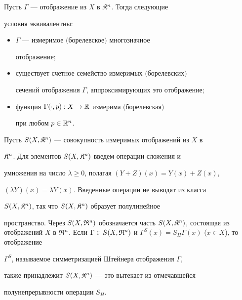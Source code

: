 \begin{prop} 


Пусть $\Gamma$ --- отображение из $X$ в $\frak K^n$. Тогда следующие 


условия эквивалентны${:}$ 


\begin{itemize} 


\item[1)] $\Gamma$ --- измеримое $($борелевское$)$ многозначное


отображение$;$ 


\item[2)] существует счетное семейство измеримых $($борелевских$)$ 


сечений отображения $\Gamma$, аппроксимирующих это отображение$;$ 


\item[3)] функция $\Gamma(\cdot,p):X\to\Bbb R$ измерима $($борелевская$)$ 


при любом $p\in\Bbb R^n$. 


\end{itemize} 


\end{prop} 


 


Пусть $S(X,\frak K^n)$ --- совокупность измеримых отображений из $X$ в 


$\frak K^n$. Для элементов $S(X,\frak K^n)$ введем операции сложения и 


умножения на число $\lambda\ge0$, полагая $(Y+Z)(x)=Y(x)+Z(x)$, 


$(\lambda Y)(x)=\lambda Y(x)$. Введенные операции не выводят из класса 


$S(X,\frak K^n)$, так что $S(X,\frak K^n)$ образует полулинейное 


пространство. Через $S(X,\frak R^n)$ обозначается часть $S(X,\frak 


K^n)$, состоящая из отображений $X$ в $\frak R^n$. Если $\Gamma\in 


S(X,\frak R^n)$ и $\Gamma^S(x)=S_H\Gamma(x)$ ($x\in X$), то отображение 


$\Gamma^S$, называемое симметризацией Штейнера отображения $\Gamma$, 


также принадлежит $S(X,\frak K^n)$ --- это вытекает из отмечавшейся 


полунепрерывности операции $S_H$. 


